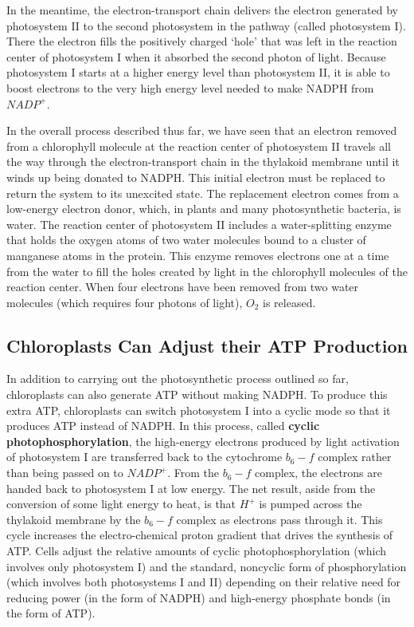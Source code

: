 In the meantime, the electron-transport chain delivers the electron generated
by photosystem II to the second photosystem in the pathway (called
photosystem I). There the electron fills the positively charged `hole' that
was left in the reaction center of photosystem I when it absorbed the
second photon of light. Because photosystem I starts at a higher energy
level than photosystem II, it is able to boost electrons to the very high
energy level needed to make NADPH from $NADP^+$.

In the overall process described thus far, we have seen that an electron
removed from a chlorophyll molecule at the reaction center of photosystem
II travels all the way through the electron-transport chain in the
thylakoid membrane until it winds up being donated to NADPH. This initial
electron must be replaced to return the system to its unexcited state.
The replacement electron comes from a low-energy electron donor,
which, in plants and many photosynthetic bacteria, is water.
The reaction center of photosystem II includes a water-splitting
enzyme that holds the oxygen atoms of two water molecules bound to a
cluster of manganese atoms in the protein.
This enzyme removes electrons one at a time from the water to
fill the holes created by light in the chlorophyll molecules of the reaction
center. When four electrons have been removed from two water molecules
(which requires four photons of light), $O_2$ is released.

\subsection{Chloroplasts Can Adjust their ATP Production}

In addition to carrying out the photosynthetic process outlined so far,
chloroplasts can also generate ATP without making NADPH. To produce
this extra ATP, chloroplasts can switch photosystem I into a cyclic mode
so that it produces ATP instead of NADPH. In this process, called \textbf{cyclic
photophosphorylation}, the high-energy electrons produced by light
activation of photosystem I are transferred back to the cytochrome $b_{6}-f$
complex rather than being passed on to $NADP^+$. From the $b_{6}-f$ complex,
the electrons are handed back to photosystem I at low energy.
The net result, aside from the conversion of some light energy
to heat, is that $H^+$ is pumped across the thylakoid membrane by the $b_{6}-f$
complex as electrons pass through it. This cycle increases the electro-chemical
proton gradient that drives the synthesis of ATP. Cells adjust
the relative amounts of cyclic photophosphorylation (which involves
only photosystem I) and the standard, noncyclic form of phosphorylation
(which involves both photosystems I and II) depending on their relative
need for reducing power (in the form of NADPH) and high-energy phosphate
bonds (in the form of ATP).

